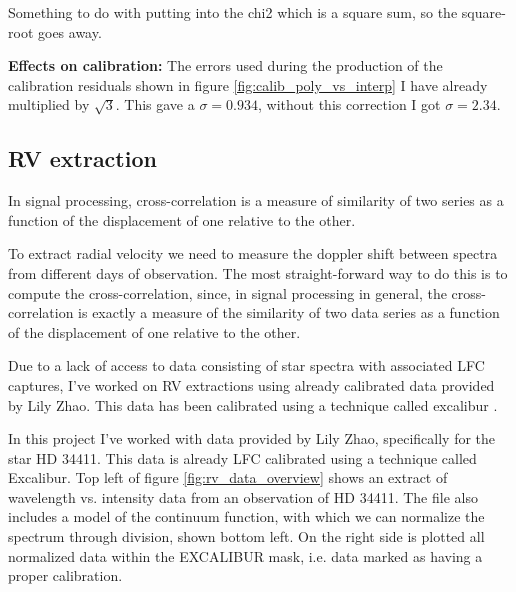      Something to do with putting into the chi2 which is a square sum, so the square-root goes away. 

    \bigbreak

    \noindent \textbf{Effects on calibration:} \newline
    The errors used during the production of the calibration residuals shown in figure \ref{fig:calib_poly_vs_interp} I have already multiplied by $\sqrt{3}$. This gave a $\sigma = 0.934$, without this correction I got $\sigma = 2.34$. 


\subsection{RV extraction}

    In signal processing, cross-correlation is a measure of similarity of two series as a function 
    of the displacement of one relative to the other.

    To extract radial velocity we need to measure the doppler shift between spectra from different days of observation. The most straight-forward way to do this is to compute the cross-correlation, since, in signal processing in general, the cross-correlation is exactly a measure of the similarity of two data series as a function of the displacement of one relative to the other.

    Due to a lack of access to data consisting of star spectra with associated LFC captures, I've worked on RV extractions using already calibrated data provided by Lily Zhao. This data has been calibrated using a technique called excalibur \cite{zhao2021excalibur}.

    In this project I've worked with data provided by Lily Zhao, specifically for the star HD 34411. This data is already LFC calibrated using a technique called Excalibur. Top left of figure \ref*{fig:rv_data_overview} shows an extract of wavelength vs. intensity data from an observation of HD 34411. The file also includes a model of the continuum function, with which we can normalize the spectrum through division, shown bottom left. On the right side is plotted all normalized data within the EXCALIBUR mask, i.e. data marked as having a proper calibration. 

